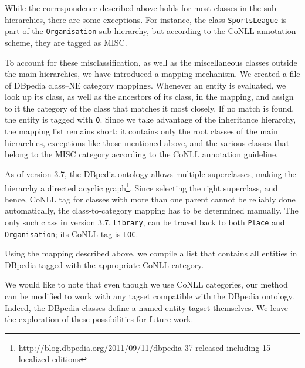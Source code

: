 \documentclass[11pt]{article}
\begin{document}
While the correspondence described above holds for most classes in the sub-hierarchies, there are some exceptions. For instance, the class \texttt{SportsLeague} is part of the \texttt{Organisation} sub-hierarchy, but according to the CoNLL annotation scheme, they are tagged as MISC. 

To account for these misclassification, as well as the miscellaneous classes outside the main hierarchies, we have introduced a mapping mechanism. We created a file of DBpedia class--NE category mappings. Whenever an entity is evaluated, we look up its class, as well as the ancestors of its class, in the mapping, and assign to it the category of the class that matches it most closely. If no match is found, the entity is tagged with \texttt{O}. Since we take advantage of the inheritance hierarchy, the mapping list remains short: it contains only the root classes of the main hierarchies, exceptions like those mentioned above, and the various classes that belong to the MISC category according to the CoNLL annotation guideline.


As of version 3.7, the DBpedia ontology allows multiple superclasses, making the hierarchy a directed acyclic graph\footnote{http://blog.dbpedia.org/2011/09/11/dbpedia-37-released-including-15-localized-editions}. Since selecting the right superclass, and hence, CoNLL tag for classes with more than one parent cannot be reliably done automatically, the class-to-category mapping has to be determined manually. The only such class in version 3.7, \texttt{Library}, can be traced back to both \texttt{Place} and \texttt{Organisation}; its CoNLL tag is \texttt{LOC}.


Using the mapping described above, we compile a list that contains all entities in DBpedia tagged with the appropriate CoNLL category.

We would like to note that even though we use CoNLL categories, our method can be modified to work with any tagset compatible with the DBpedia ontology. Indeed, the DBpedia classes define a named entity tagset themselves. We leave the exploration of these possibilities for future work.
\end{document}
